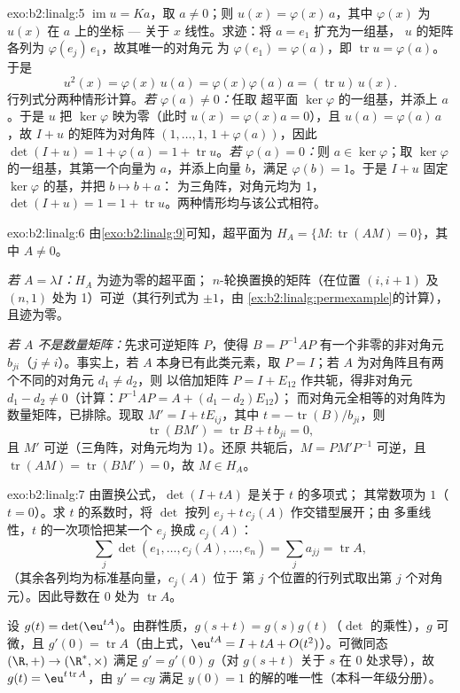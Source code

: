 \begin{solution}{exo:b2:linalg:5}
$\operatorname{im} u = Ka$，取 $a \neq 0$；则 $u(x) =
\varphi(x)\,a$，其中 $\varphi(x)$ 为 $u(x)$ 在 $a$ 上的坐标
--- 关于 $x$ 线性。求迹：将 $a = e_1$ 扩充为一组基，
$u$ 的矩阵各列为 $\varphi(e_j)\,e_1$，故其唯一的对角元
为 $\varphi(e_1) = \varphi(a)$，即 $\operatorname{tr} u =
\varphi(a)$。于是
\[
u^2(x) = \varphi(x)\, u(a) = \varphi(x)\varphi(a)\, a
= (\operatorname{tr} u)\, u(x).
\]
行列式分两种情形计算。\emph{若 $\varphi(a) \neq 0$：}任取
超平面 $\ker\varphi$ 的一组基，并添上 $a$。于是 $u$ 把
$\ker\varphi$ 映为零（此时 $u(x) = \varphi(x)a = 0$），且 $u(a) =
\varphi(a)\,a$，故 $I + u$ 的矩阵为对角阵 $(1, \dots, 1,\,
1 + \varphi(a))$，因此 $\det(I + u) = 1 + \varphi(a) = 1 +
\operatorname{tr} u$。\emph{若 $\varphi(a) = 0$：}则 $a \in
\ker\varphi$；取 $\ker\varphi$ 的一组基，其第一个向量为
$a$，并添上向量 $b$，满足 $\varphi(b) = 1$。于是 $I + u$
固定 $\ker\varphi$ 的基，并把 $b \mapsto b + a$：
为三角阵，对角元均为 1，$\det(I + u) = 1 = 1 +
\operatorname{tr} u$。两种情形均与该公式相符。
\end{solution}

\begin{solution}{exo:b2:linalg:6}
由\cref{exo:b2:linalg:9}可知，超平面为 $H_A = \{M :
\operatorname{tr}(AM) = 0\}$，其中 $A \neq 0$。

\emph{若 $A = \lambda I$：}$H_A$ 为迹为零的超平面；
$n$-轮换置换的矩阵（在位置 $(i, i+1)$
及 $(n, 1)$ 处为 1）可逆（其行列式为 $\pm 1$，由
\cref{ex:b2:linalg:permexample}的计算），且迹为零。

\emph{若 $A$ 不是数量矩阵：}先求可逆矩阵 $P$，使得
$B = P^{-1}AP$ 有一个非零的非对角元 $b_{ji}$（$j \neq
i$）。事实上，若 $A$ 本身已有此类元素，取 $P = I$；若 $A$
为对角阵且有两个不同的对角元 $d_1 \neq d_2$，则
以倍加矩阵 $P = I + E_{12}$ 作共轭，得非对角元
$d_1 - d_2 \neq 0$（计算：$P^{-1}AP = A + (d_1 - d_2)E_{12}$）；
而对角元全相等的对角阵为
数量矩阵，已排除。现取 $M' = I + tE_{ij}$，其中 $t =
-\operatorname{tr}(B)/b_{ji}$，则
\[
\operatorname{tr}(BM') = \operatorname{tr} B + t\,b_{ji} = 0,
\]
且 $M'$ 可逆（三角阵，对角元均为 1）。还原
共轭后，$M = PM'P^{-1}$ 可逆，且
$\operatorname{tr}(AM) = \operatorname{tr}(BM') = 0$，故 $M \in H_A$。
\end{solution}

\begin{solution}{exo:b2:linalg:7}
由置换公式，$\det(I + tA)$ 是关于 $t$ 的多项式；
其常数项为 $1$（$t = 0$）。求 $t$ 的系数时，将
$\det$ 按列 $e_j + t\,c_j(A)$ 作交错型展开；由
多重线性，$t$ 的一次项恰把某一个 $e_j$ 换成
$c_j(A)$：
\[
\sum_{j} \det(e_1, \dots, c_j(A), \dots, e_n)
= \sum_j a_{jj} = \operatorname{tr} A ,
\]
（其余各列均为标准基向量，$c_j(A)$ 位于
第 $j$ 个位置的行列式取出第 $j$ 个对角元）。因此导数在 $0$ 处为
$\operatorname{tr} A$。

设 $g(t) = \det(\eu^{tA})$。由群性质，$g(s + t) =
g(s)g(t)$（$\det$ 的乘性），$g$ 可微，且
$g'(0) = \operatorname{tr} A$（由上式，$\eu^{tA} = I + tA +
O(t^2)$）。可微同态 $(\R, +) \to (\R^*, \times)$
满足 $g' = g'(0)\,g$（对 $g(s+t)$ 关于 $s$ 在 $0$ 处求导），故
$g(t) = \eu^{t\operatorname{tr} A}$，由
$y' = cy$ 满足 $y(0) = 1$ 的解的唯一性（本科一年级分册）。
\end{solution}

